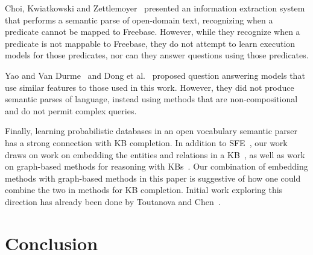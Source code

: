 \documentclass[11pt,letterpaper]{article}
\begin{document}
Choi, Kwiatkowski and Zettlemoyer~
presented an information extraction system that performs a semantic parse of open-domain text,
recognizing when a predicate cannot be mapped to Freebase.  However, while they recognize when a
predicate is not mappable to Freebase, they do not attempt to learn execution models for those
predicates, nor can they answer questions using those predicates.

Yao and Van Durme~ and Dong et
al.~ proposed question answering models that use similar
features to those used in this work.  However, they did not produce semantic parses of language,
instead using methods that are non-compositional and do not permit complex queries.

Finally, learning probabilistic databases in an open vocabulary semantic parser has a strong
connection with KB completion.  In addition to SFE~\cite{gardner-2015-sfe}, our work draws on work
on embedding the entities and relations in a
KB~\cite{riedel-2013-mf-universal-schema,nickel-2011-rescal,%
bordes-2013-transe,nickel-2014-are,toutanova-2015-joint-text-kb-embedding}, as well as work on
graph-based methods for reasoning with
KBs~\cite{lao-2010-original-pra,gardner-2014-vector-space-pra,neelakantan-2015-rnn-kbc,%
bornea-2015-relational-path-mining}.  Our combination of embedding methods with graph-based methods
in this paper is suggestive of how one could combine the two in methods for KB completion.  Initial
work exploring this direction has already been done by Toutanova and
Chen~.


\section{Conclusion}
\label{sec:conclusion}
\end{document}
